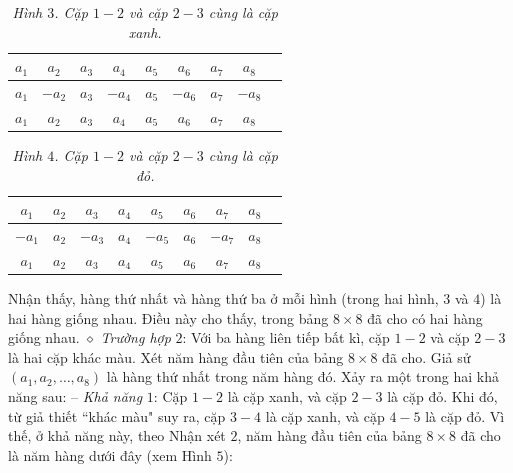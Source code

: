 \begin{multicols}{2}
\begin{table}[H]
		\begin{tabular}{|c|c|c|c|c|c|c|c|c|}
			\hline
			$a_1$ & $a_2$ & $a_3$ & $a_4$ & $a_5$ & $a_6$ & $a_7$ & $a_8$ \\
			\hline
			$a_1$ & $-a_2$ & $a_3$ & $-a_4$ & $a_5$ & $-a_6$ & $a_7$ & $-a_8$ \\
			\hline
			$a_1$ & $a_2$ & $a_3$ & $a_4$ & $a_5$ & $a_6$ & $a_7$ & $a_8$ \\
			\hline
		\end{tabular}
		\caption{\small\textit{\color{thachthuctoanhoc}Hình $3$. Cặp $1 - 2$ và cặp $2 - 3$ cùng là cặp xanh.}}
		\vspace*{-10pt}
	\end{table}
	\begin{table}[H]
		\vspace*{-5pt}
		\centering
		\captionsetup{labelformat= empty, justification=centering}
		\begin{tabular}{|c|c|c|c|c|c|c|c|c|}
			\hline
			$a_1$ & $a_2$ & $a_3$ & $a_4$ & $a_5$ & $a_6$ & $a_7$ & $a_8$ \\
			\hline
			$-a_1$ & $a_2$ & $-a_3$ & $a_4$ & $-a_5$ & $a_6$ & $-a_7$ & $a_8$ \\
			\hline
			$a_1$ & $a_2$ & $a_3$ & $a_4$ & $a_5$ & $a_6$ & $a_7$ & $a_8$ \\
			\hline
		\end{tabular}
		\caption{\small\textit{\color{thachthuctoanhoc}Hình $4$. Cặp $1 - 2$ và cặp $2 - 3$ cùng là cặp đỏ.}}
		\vspace*{-10pt}
	\end{table}
	Nhận thấy, hàng thứ nhất và hàng thứ ba ở mỗi hình (trong hai hình, $3$ và $4$) là hai hàng giống nhau. Điều này cho thấy, trong bảng $8 \times 8$ đã cho có hai hàng giống nhau.
	\vskip 0.05cm
	$\diamond$ \textit{Trường hợp} $2$: Với ba hàng liên tiếp bất kì, cặp $1 - 2$ và cặp $2 - 3$ là hai cặp khác màu.
	\vskip 0.05cm
	Xét năm hàng đầu tiên của bảng $8 \times  8$ đã cho.
	\vskip 0.05cm
	Giả sử $\left( {{a_1},{a_2}, \ldots ,{a_8}} \right)$ là hàng thứ nhất trong năm hàng đó.
	\vskip 0.05cm
	Xảy ra một trong hai khả năng sau:
	\vskip 0.05cm
	-- \textit{Khả năng} $1$: Cặp $1 - 2$ là cặp xanh, và cặp $2 - 3$ là cặp đỏ.
	\vskip 0.05cm
	Khi đó, từ giả thiết ``khác màu" suy ra, cặp $3 - 4$ là cặp xanh, và cặp $4 - 5$ là cặp đỏ.
	\vskip 0.05cm
	Vì thế, ở khả năng này, theo Nhận xét $2$, năm hàng đầu tiên của bảng $8 \times  8$ đã cho là năm hàng dưới đây (xem Hình $5$):
	\begin{table}[H]
		\vspace*{-5pt}

\end{table}
\end{multicols}
